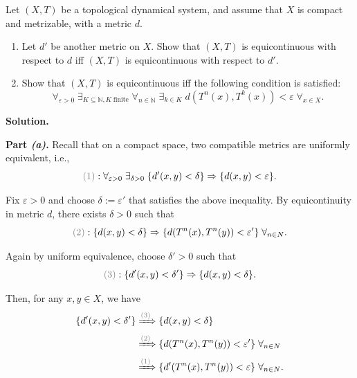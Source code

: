 \documentclass{template}
\begin{document}
\newpage

\begin{problem}[Exercise 2]
    Let $(X,T)$ be a topological dynamical system, and assume that $X$
    is compact and metrizable, with a metric $d$.
    \begin{enumerate}
        \item[(a)] Let $d'$ be another metric on $X$. Show that $(X,T)$ is 
        equicontinuous with respect to $d$ iff $(X,T)$ is equicontinuous with 
        respect to $d'$.
        \item[(b)] Show that $(X,T)$ is equicontinuous iff the following condition 
        is satisfied:
        \begin{equation*}
            \forall_{\varepsilon>0} \; \exists_{K \subseteq \mathbb{N}, K \; \text{finite}} \; \forall_{n \in \mathbb{N}} \; \exists_{k \in K} \; d(T^n(x), T^k(x)) < \varepsilon \; \forall_{x \in X}.
        \end{equation*}
    \end{enumerate}
\end{problem}

\textbf{Solution.}

\textcolor{blue!70!black}{\textbf{Part \textit{(a)}.}} Recall that on a compact 
space, two compatible metrics are uniformly equivalent, i.e.,
\begin{equation*}
    \textcolor{gray}{(1)}: \forall_{\varepsilon>0} \; \exists_{\delta>0} \; \{d'(x,y) < \delta\} \Rightarrow \{d(x,y) < \varepsilon\}.
\end{equation*}

Fix $\varepsilon>0$ and choose $\delta := \varepsilon'$ that satisfies the above inequality. By 
equicontinuity in metric $d$, there exists $\delta>0$ such that
\begin{equation*}
    \textcolor{gray}{(2)}: \{d(x,y) < \delta\} \Rightarrow \{d(T^n(x), T^n(y))<\varepsilon'\} \; \forall_{n \in \mathbb{N}}. 
\end{equation*}

Again by uniform equivalence, choose $\delta'>0$ such that
\begin{equation*}
    \textcolor{gray}{(3)}: \{d'(x,y) < \delta'\} \Rightarrow \{d(x,y) < \delta\}.
\end{equation*}

Then, for any $x,y \in X$, we have
\begin{align*}
    \{d'(x,y)<\delta'\} 
    &\xRightarrow{\textcolor{gray}{(3)}} \{d(x,y)<\delta\} \\
    &\xRightarrow{\textcolor{gray}{(2)}} \{d(T^n(x), T^n(y)) < \varepsilon'\} \; \forall_{n \in \mathbb{N}} \\
    &\xRightarrow{\textcolor{gray}{(1)}} \{d'(T^n(x), T^n(y)) < \varepsilon\} \; \forall_{n \in \mathbb{N}}.
\end{align*}
\end{document}
